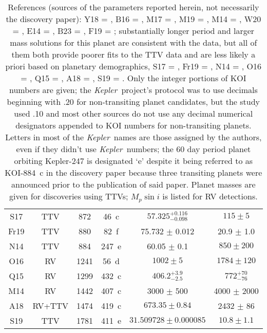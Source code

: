 \documentclass{aastex62}
\newcommand{\ik}{{\it Kepler~}}
\begin{document}
\begin{table}[!hbt]
\begin{tabular}{|c|c||c|c||c|c|}
S17 & TTV & 872 & 46~c & $57.325^{+0.116}_{-0.098}$ &$115 \pm 5$\\
Fr19 & TTV & 880  & 82~f & 75.732 $\pm$ 0.012 & 20.9 $\pm$ 1.0  \\
N14 & TTV & 884 & 247~e & 60.05 $\pm$ 0.1 & $850 \pm 200$\\
O16  & RV  & 1241 & 56~d & $1002 \pm 5$ & $1784 \pm 120$\\
Q15 & RV & 1299 & 432~c & $406.2^{+3.9}_{-2.5}$ & $772^{+70}_{-76}$\\
M14  & RV  & 1442 & 407~c &  3000 $\pm$ 500 &  4000 $\pm$ 2000 \\ 
A18 & RV+TTV & 1474 & 419~c &  $673.35 \pm 0.84$ & 2432 $\pm$ 86\\
S19 & TTV & 1781 & 411~e & $31.509728 \pm 0.000085$ & $10.8 \pm 1.1$\\
 \hline
    \end{tabular}
    \caption{References (sources of the parameters reported herein, not necessarily the discovery paper): Y18 = \cite{Yee:2018}, B16 = \cite{Buchhave:2016}, M17 = \cite{Malavolta:2017}, M19 = \cite{Mills:2019}, M14 = \cite{Marcy:2014}, W20 = \citet{Weiss:2020}, %
    E14 = \cite{Endl:2014}, B23 = \cite{Bonomo:2023}, %
    F19 = \cite{Fox:2019}; substantially longer period and larger mass solutions for this planet are consistent with the data, but all of them both provide poorer fits to the TTV data and are less likely a priori based on planetary demographics, S17 = \cite{Saad:2017}, Fr19 = \cite{Freudenthal:2019}, N14 = \cite{Nesvorny:2014}%
    , O16 = \cite{Otor:2016}, Q15 = \cite{Quinn:2015},  A18 = \cite{Almenara:2018}, S19 = \cite{Sun:2019}. Only the integer portions of KOI numbers are given; the \ik project's protocol was to use decimals beginning with .20 for non-transiting planet candidates, but the \cite{Marcy:2014} study used .10 and most other sources do not use any decimal numerical designators appended to KOI numbers for non-transiting planets.  Letters in most of the \ik names are those assigned by the authors, even if they didn't use \ik numbers; the 60 day period planet orbiting Kepler-247 is designated `e' despite it being referred to as KOI-884~c in the discovery paper because three transiting planets were announced prior to the publication of said paper. Planet masses are given for discoveries using TTVs; $M_p \sin{i}$ is listed for  RV  detections. %
}
    \label{tab:nontransiting}
\end{table}  
\end{document}
